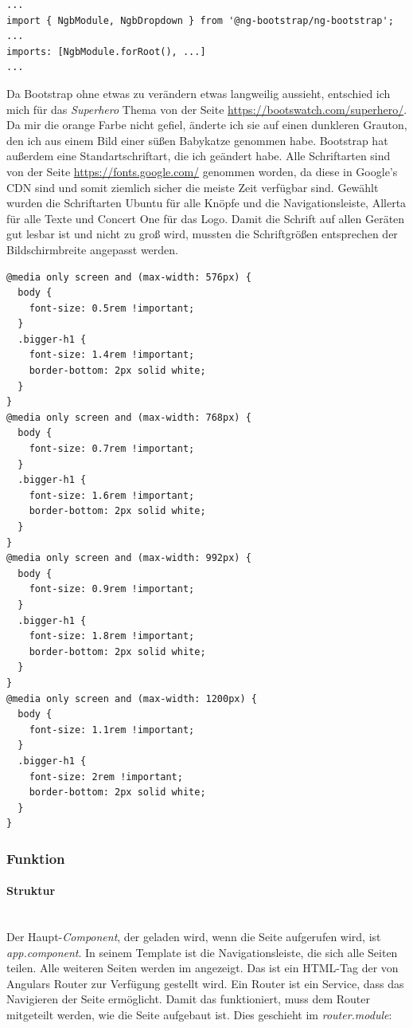 \begin{lstlisting}[caption=app.module (Auszug) Importieren von ng-bootstrap,label=import-ng-bootstrap,style=TS]
...
import { NgbModule, NgbDropdown } from '@ng-bootstrap/ng-bootstrap';
...
imports: [NgbModule.forRoot(), ...]
...
\end{lstlisting}

Da Bootstrap ohne etwas zu verändern etwas langweilig aussieht, entschied ich mich für das \textit{Superhero} Thema von der Seite \url{https://bootswatch.com/superhero/}. Da mir die orange Farbe nicht gefiel, änderte ich sie auf einen dunkleren Grauton, den ich aus einem Bild einer süßen Babykatze genommen habe. Bootstrap hat außerdem eine Standartschriftart, die ich geändert habe. Alle Schriftarten sind von der Seite \url{https://fonts.google.com/} genommen worden, da diese in Google's \ac{CDN} sind und somit ziemlich sicher die meiste Zeit verfügbar sind. Gewählt wurden die Schriftarten Ubuntu für alle Knöpfe und die Navigationsleiste, Allerta für alle Texte und Concert One für das Logo. Damit die Schrift auf allen Geräten gut lesbar ist und nicht zu groß wird, mussten die Schriftgrößen entsprechen der Bildschirmbreite angepasst werden.

\begin{lstlisting}[caption=Schriftgrößen entsprechend der Bildschirmbreite,label=css-font-sizes,style=css]
@media only screen and (max-width: 576px) {
  body {
    font-size: 0.5rem !important;
  }
  .bigger-h1 {
    font-size: 1.4rem !important;
    border-bottom: 2px solid white;
  }
}
@media only screen and (max-width: 768px) {
  body {
    font-size: 0.7rem !important;
  }
  .bigger-h1 {
    font-size: 1.6rem !important;
    border-bottom: 2px solid white;
  }
}
@media only screen and (max-width: 992px) {
  body {
    font-size: 0.9rem !important;
  }
  .bigger-h1 {
    font-size: 1.8rem !important;
    border-bottom: 2px solid white;
  }
}
@media only screen and (max-width: 1200px) {
  body {
    font-size: 1.1rem !important;
  }
  .bigger-h1 {
    font-size: 2rem !important;
    border-bottom: 2px solid white;
  }
}
\end{lstlisting}

\subsubsection{Funktion}
\label{sec:ums-client-funktion}

\paragraph*{Struktur} \mbox {}\\
Der Haupt-\textit{Component}, der geladen wird, wenn die Seite aufgerufen wird, ist \textit{app.component}. In seinem Template ist die Navigationsleiste, die sich alle Seiten teilen. Alle weiteren Seiten werden im  angezeigt. Das ist ein \ac{HTML}-Tag der von Angulars Router zur Verfügung gestellt wird. Ein Router ist ein Service, dass das Navigieren der Seite ermöglicht. Damit das funktioniert, muss dem Router mitgeteilt werden, wie die Seite aufgebaut ist. Dies geschieht im \textit{router.module}:

